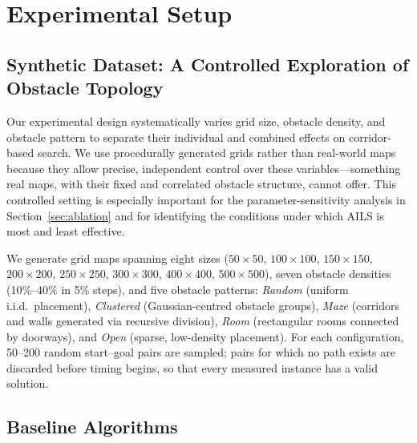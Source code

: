 \documentclass[journal]{IEEEtran}
\begin{document}
\section{Experimental Setup}
\label{sec:experiments}

\subsection{Synthetic Dataset: A Controlled Exploration of Obstacle Topology}
\label{sec:dataset}

Our experimental design systematically varies grid size, obstacle density, and obstacle pattern to separate their individual and combined effects on corridor-based search.
We use procedurally generated grids rather than real-world maps because they allow precise, independent control over these variables---something real maps, with their fixed and correlated obstacle structure, cannot offer.
This controlled setting is especially important for the parameter-sensitivity analysis in Section~\ref{sec:ablation} and for identifying the conditions under which AILS is most and least effective.

We generate grid maps spanning eight sizes ($50{\times}50$, $100{\times}100$, $150{\times}150$, $200{\times}200$, $250{\times}250$, $300{\times}300$, $400{\times}400$, $500{\times}500$), seven obstacle densities (10\%--40\% in 5\% steps), and five obstacle patterns:
\emph{Random} (uniform i.i.d.\ placement),
\emph{Clustered} (Gaussian-centred obstacle groups),
\emph{Maze} (corridors and walls generated via recursive division),
\emph{Room} (rectangular rooms connected by doorways), and
\emph{Open} (sparse, low-density placement).
For each configuration, 50--200 random start--goal pairs are sampled; pairs for which no path exists are discarded before timing begins, so that every measured instance has a valid solution.

\subsection{Baseline Algorithms}
\label{sec:baselines}
\end{document}
